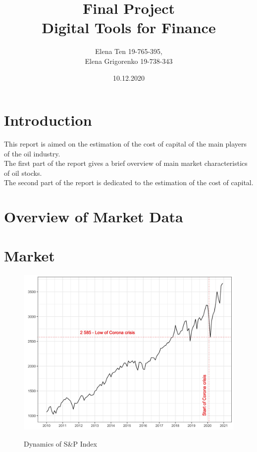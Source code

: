 \documentclass [a4paper, 11pt] {article}
\begin{document}
\title {\Huge Final Project \\
 \Huge Digital Tools for Finance }
\author {\huge Elena Ten 19-765-395, \\
	 	 \huge Elena Grigorenko 19-738-343}

\date {\huge 10.12.2020}



\maketitle
\thispagestyle{empty}

\newpage

\tableofcontents

\newpage

\section {Introduction}
This report is aimed on the estimation of the cost of capital of the main players of the oil industry.\\
The first part of the report gives a brief overview of main market characteristics of oil stocks.\\
The second part of the report is dedicated to the estimation of the cost of capital.

\section {Overview of Market Data}

\section{Market}
\begin{figure}[h]
\caption{Dynamics of S\&P Index}
\includegraphics[scale=0.17]{sandp}
\label{fig:sandp}
\end{figure}
\end{document}
